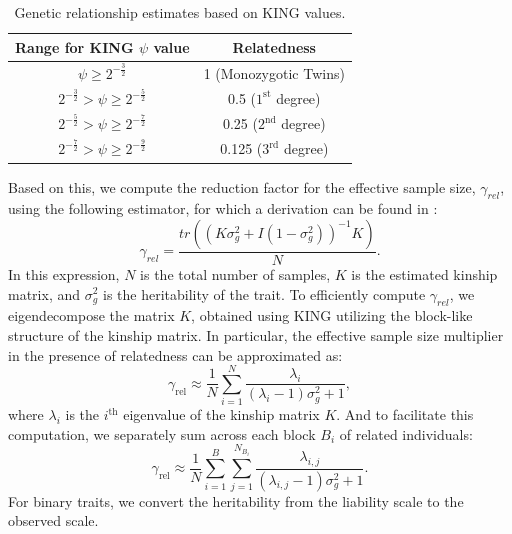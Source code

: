 \begin{table}[h!]
\centering
\begin{tabular}{|c|c|}
\hline
\textbf{Range for KING $\psi$ value} & \textbf{Relatedness} \\
\hline
$\psi \geq 2^{-\frac{3}{2}}$ & 1 (Monozygotic Twins) \\
$2^{-\frac{3}{2}} > \psi \geq 2^{-\frac{5}{2}}$ & 0.5 ($1^{\text{st}}$ degree) \\
$2^{-\frac{5}{2}} > \psi \geq 2^{-\frac{7}{2}}$ & 0.25 ($2^{\text{nd}}$ degree) \\
$2^{-\frac{7}{2}} > \psi \geq 2^{-\frac{9}{2}}$ & 0.125 ($3^{\text{rd}}$ degree) \\
\hline
\end{tabular}
\caption{Genetic relationship estimates based on KING values.}
\label{tab:my_label}
\end{table}

Based on this, we compute the reduction factor for the effective sample size, $\gamma_{rel}$, using the following estimator, for which a derivation can be found in \cite{ziyatdinov2021estimating}:
\begin{equation}
\gamma_{rel} = \frac{tr((K \sigma_g^2 + I (1-\sigma_g^2))^{-1}K)}{N}.
\label{eq:calib_rel}
\end{equation}
In this expression, $N$ is the total number of samples, $K$ is the estimated kinship matrix, and $\sigma_g^2$ is the heritability of the trait.
%
To efficiently compute $\gamma_{rel}$, we eigendecompose the matrix $K$, obtained using KING utilizing the block-like structure of the kinship matrix. 
%
In particular, the effective sample size multiplier in the presence of relatedness can be approximated as:
\begin{equation}
\gamma_{\text{rel}} \approx \frac{1}{N}\sum\limits_{i=1}^{N} \frac{\lambda_i}{(\lambda_i - 1)\sigma_g^2 + 1},
\end{equation}
where $\lambda_i$ is the $i^{\text{th}}$ eigenvalue of the kinship matrix $K$.
%
And to facilitate this computation, we separately sum across each block $B_i$ of related individuals:
\begin{equation}
\gamma_{\text{rel}} \approx \frac{1}{N} \sum\limits_{i=1}^{B} \sum\limits_{j=1}^{N_{B_i}} \frac{\lambda_{i,j}}{(\lambda_{i,j} - 1)\sigma_g^2 + 1}.
\end{equation}
%
For binary traits, we convert the heritability from the liability scale to the observed scale.
%

\vspace{2mm}

